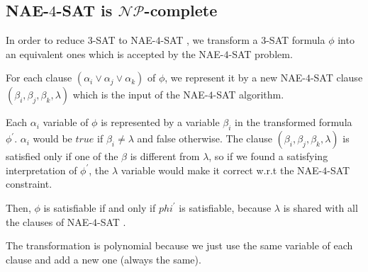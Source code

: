 \documentclass[a4paper,11pt]{report}
\newcommand*{\NPcp}{$\mathcal{NP}$-complete }
\newcommand*{\N}{NAE-$4$-SAT }
\begin{document}
\subsection*{\N is \NPcp}

In order to reduce $3$-SAT to \N, we transform a $3$-SAT formula $\phi$ into an
equivalent ones which is accepted by the \N problem.

For each clause $(\alpha_i \vee \alpha_j \vee \alpha_k)$ of $\phi$, we represent it by a new \N
clause $(\beta_i,\beta_j,\beta_k,\lambda)$ which is the input of the \N algorithm.

Each $\alpha_i$ variable of $\phi$ is represented by a variable $\beta_i$ in the
transformed formula $\phi^\prime$. $\alpha_i$ would be $true$ if $\beta_i \neq \lambda$ and false
otherwise. The clause $(\beta_i,\beta_j,\beta_k,\lambda)$ is satisfied only if one of the
$\beta$ is different from $\lambda$, so if we found a satisfying interpretation of
$\phi^\prime$, the $\lambda$ variable would make it correct w.r.t the \N constraint.

Then, $\phi$ is satisfiable if and only if $phi^\prime$ is satisfiable, because
$\lambda$ is shared with all the clauses of \N.

The transformation is polynomial because we just use the same variable of each
clause and add a new one (always the same).
\end{document}
